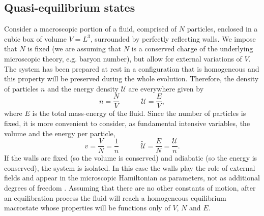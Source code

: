 \documentclass[useAMS,usenatbib,prd,twocolumn,nofootinbib]{revtex4-1}
\newcommand{\spc}{\quad \quad \quad}
\begin{document}
\subsection{Quasi-equilibrium states}\label{Qes}

Consider a macroscopic portion of a fluid, comprised of $N$ particles, enclosed in a cubic box of volume $V=L^3$, surrounded by perfectly reflecting walls. 
We impose that $N$ is fixed (we are assuming that $N$ is a conserved charge of the underlying microscopic theory, e.g. baryon number), but allow for external variations of $V$. The system has been prepared at rest in a configuration that is homogeneous and this property will be preserved during the whole evolution. 
Therefore, the density of particles $n$ and the energy density $\mathcal{U}$ are everywhere given by
\begin{equation}\label{gandalf}
n = \dfrac{N}{V}  \spc  \mathcal{U} = \dfrac{E}{V},
\end{equation}
where $E$ is the total mass-energy of the fluid. 
Since the number of particles is fixed, it is more convenient to consider, as fundamental intensive variables, the volume and the energy per particle,  
\begin{equation}
\label{inv}
v = \dfrac{V}{N}= \dfrac{1}{n} \spc  \tilde{\mathcal{U}} = \dfrac{E}{N}=\dfrac{\mathcal{U}}{n}. 
\end{equation}
If the walls are fixed (so the volume is conserved) and adiabatic (so the energy is conserved), the system is isolated. In this case the walls play the role of external fields and appear in the microscopic Hamiltonian as parameters, not as additional degrees of freedom \citep{landau5}. Assuming that there are no other constants of motion, after an equilibration process the  fluid will reach a homogeneous equilibrium macrostate whose properties will be functions only of $V$, $N$ and $E$.
\end{document}
